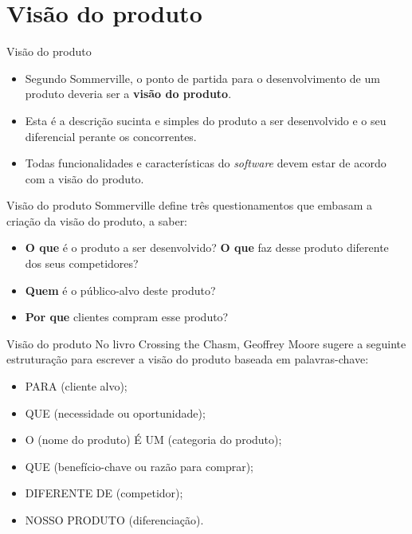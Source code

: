 \documentclass[11pt]{beamer}
\begin{document}
   \section{Visão do produto}

   \begin{frame}{Visão do produto}
      \begin{itemize}
         \item Segundo Sommerville, o ponto de partida para o desenvolvimento de um produto deveria ser a \textbf{visão do produto}.
         \item Esta é a descrição sucinta e simples do produto a ser desenvolvido e o seu diferencial perante os concorrentes.
         \item Todas funcionalidades e características do \textit{software} devem estar de acordo com a visão do produto.
      \end{itemize}
   \end{frame}

   \begin{frame}{Visão do produto}
      Sommerville define três questionamentos que embasam a criação da visão do produto, a saber:
      \begin{itemize}
         \item \textbf{O que} é o produto a ser desenvolvido? \textbf{O que} faz desse produto diferente dos seus competidores?
         \item \textbf{Quem} é o público-alvo deste produto?
         \item \textbf{Por que} clientes compram esse produto?
      \end{itemize}
   \end{frame}

   \begin{frame}{Visão do produto}
      No livro Crossing the Chasm, Geoffrey Moore sugere a seguinte estruturação para escrever a visão do produto baseada em palavras-chave:
      \begin{itemize}
         \item PARA (cliente alvo);
         \item QUE (necessidade ou oportunidade);
         \item O (nome do produto) É UM (categoria do produto);
         \item QUE (benefício-chave ou razão para comprar);
         \item DIFERENTE DE (competidor);
         \item NOSSO PRODUTO (diferenciação).
      \end{itemize}
   \end{frame}
\end{document}
